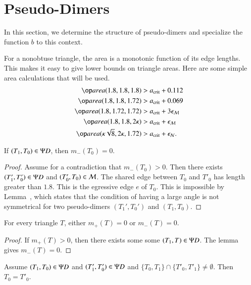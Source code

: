 \section{Pseudo-Dimers}

In this section, we determine the structure of pseudo-dimers and
specialize the function $b$ to this context.

For a nonobtuse triangle, the area is a monotonic function of its edge
lengths.  This makes it easy to give lower bounds on triangle areas.
Here are some simple area calculations that will be used.
\begin{align*}
\area(1.8,1.8,1.8) &> \acrit + 0.112\\
\area(1.8,1.8,1.72) &> \acrit + 0.069\\
\area(1.8,1.72,1.72) &> \acrit + 3\epsM\\
\area(1.8,1.8,2\kappa) &> \acrit + \epsM\\
\area(\kappa\sqrt8,2\kappa,1.72) &> \acrit +\epsN.
\end{align*}

\begin{lemma}  
If $(T_1,T_0)\in\Psi D$, then $m_-(T_0)=0$.
\end{lemma}

\begin{proof} 
  Assume for a contradiction that $m_-(T_0)>0$.  Then there exists
  $(T'_1,T_0')\in\Psi D$ and $(T'_0,T_0)\in\mathcal M$.  The shared edge between
  $T_0$ and $T'_0$ has length greater than $1.8$.  This is the
  egressive edge $e$ of $T_0$.  This is impossible by
  Lemma~, which states that the condition of having a
  large angle is not symmetrical for two pseudo-dimers $(T_1',T_0')$
  and $(T_1,T_0)$.
\end{proof}

\begin{corollary}  
  For every triangle $T$, either $m_+(T)=0$ or $m_-(T)=0$.
\end{corollary}

\begin{proof}  
  If $m_+(T)>0$, then there exists some some $(T_1,T)\in\Psi D$.  The
  lemma gives $m_-(T)=0$.
\end{proof}

\begin{lemma}  
  Assume $(T_1,T_0)\in \Psi D$ and $(T'_1,T'_0)\in\Psi D$ and
  $\{T_0,T_1\}\cap\{T'_0,T'_1\} \ne \emptyset$.  Then $T_0 = T'_0$.
\end{lemma}

